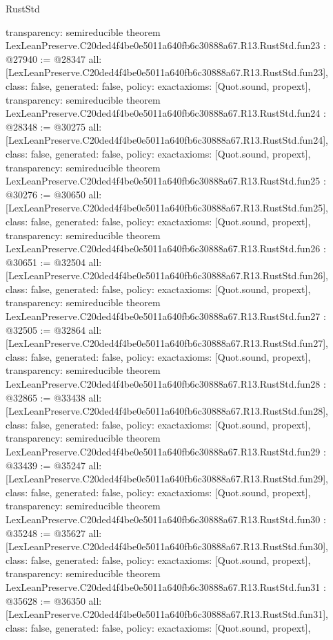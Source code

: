 \begin{lexlean}{RustStd}
\begin{coremodule}
{  transparency: semireducible
}
theorem LexLeanPreserve.C20ded4f4be0e5011a640fb6c30888a67.R13.RustStd.fun23 : @27940 := @28347 {
  all: [LexLeanPreserve.C20ded4f4be0e5011a640fb6c30888a67.R13.RustStd.fun23],
  class: false,
  generated: false,
  policy: exact{axioms: [Quot.sound, propext]},
  transparency: semireducible
}
theorem LexLeanPreserve.C20ded4f4be0e5011a640fb6c30888a67.R13.RustStd.fun24 : @28348 := @30275 {
  all: [LexLeanPreserve.C20ded4f4be0e5011a640fb6c30888a67.R13.RustStd.fun24],
  class: false,
  generated: false,
  policy: exact{axioms: [Quot.sound, propext]},
  transparency: semireducible
}
theorem LexLeanPreserve.C20ded4f4be0e5011a640fb6c30888a67.R13.RustStd.fun25 : @30276 := @30650 {
  all: [LexLeanPreserve.C20ded4f4be0e5011a640fb6c30888a67.R13.RustStd.fun25],
  class: false,
  generated: false,
  policy: exact{axioms: [Quot.sound, propext]},
  transparency: semireducible
}
theorem LexLeanPreserve.C20ded4f4be0e5011a640fb6c30888a67.R13.RustStd.fun26 : @30651 := @32504 {
  all: [LexLeanPreserve.C20ded4f4be0e5011a640fb6c30888a67.R13.RustStd.fun26],
  class: false,
  generated: false,
  policy: exact{axioms: [Quot.sound, propext]},
  transparency: semireducible
}
theorem LexLeanPreserve.C20ded4f4be0e5011a640fb6c30888a67.R13.RustStd.fun27 : @32505 := @32864 {
  all: [LexLeanPreserve.C20ded4f4be0e5011a640fb6c30888a67.R13.RustStd.fun27],
  class: false,
  generated: false,
  policy: exact{axioms: [Quot.sound, propext]},
  transparency: semireducible
}
theorem LexLeanPreserve.C20ded4f4be0e5011a640fb6c30888a67.R13.RustStd.fun28 : @32865 := @33438 {
  all: [LexLeanPreserve.C20ded4f4be0e5011a640fb6c30888a67.R13.RustStd.fun28],
  class: false,
  generated: false,
  policy: exact{axioms: [Quot.sound, propext]},
  transparency: semireducible
}
theorem LexLeanPreserve.C20ded4f4be0e5011a640fb6c30888a67.R13.RustStd.fun29 : @33439 := @35247 {
  all: [LexLeanPreserve.C20ded4f4be0e5011a640fb6c30888a67.R13.RustStd.fun29],
  class: false,
  generated: false,
  policy: exact{axioms: [Quot.sound, propext]},
  transparency: semireducible
}
theorem LexLeanPreserve.C20ded4f4be0e5011a640fb6c30888a67.R13.RustStd.fun30 : @35248 := @35627 {
  all: [LexLeanPreserve.C20ded4f4be0e5011a640fb6c30888a67.R13.RustStd.fun30],
  class: false,
  generated: false,
  policy: exact{axioms: [Quot.sound, propext]},
  transparency: semireducible
}
theorem LexLeanPreserve.C20ded4f4be0e5011a640fb6c30888a67.R13.RustStd.fun31 : @35628 := @36350 {
  all: [LexLeanPreserve.C20ded4f4be0e5011a640fb6c30888a67.R13.RustStd.fun31],
  class: false,
  generated: false,
  policy: exact{axioms: [Quot.sound, propext]},
}
\end{coremodule}
\end{lexlean}
